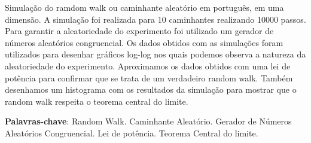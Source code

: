 
\begin{resumo}

    Simulação do ramdom walk ou caminhante aleatório em português, em uma dimensão. 
    A simulação foi realizada para 10 caminhantes realizando 10000 passos. Para 
    garantir a aleatoriedade do experimento foi utilizado um gerador de números 
    aleatórios congruencial. Os dados obtidos com as simulações foram utilizados para 
    desenhar gráficos log-log nos quais podemos observa a natureza da aleatoriedade do
    experimento. Aproximamos os dados obtidos com uma lei de potência para confirmar que
    se trata de um verdadeiro random walk. Também desenhamos um histograma com os resultados
    da simulação para mostrar que o random walk respeita o teorema central do limite.       

    \par\vspace{\baselineskip}

    \textbf{Palavras-chave}: Random Walk. Caminhante Aleatório. Gerador de Números Aleatórios Congruencial. Lei de potência. Teorema Central do limite.
\end{resumo}


